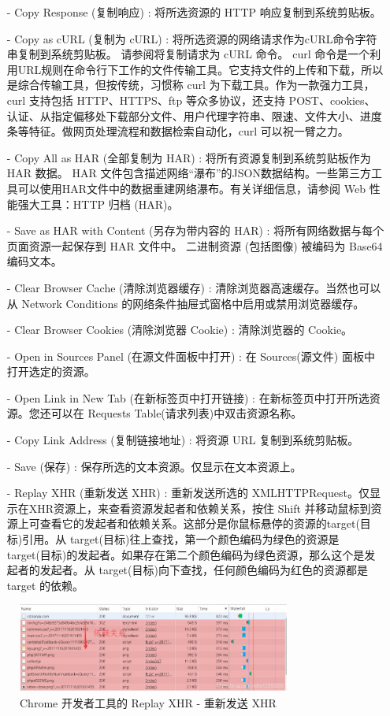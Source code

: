 \begin{itemize}
\item [-] Copy Response (复制响应) : 将所选资源的 HTTP 响应复制到系统剪贴板。
\item [-] Copy as cURL (复制为 cURL) : 将所选资源的网络请求作为cURL命令字符串复制到系统剪贴板。 请参阅将复制请求为 cURL 命令。 curl 命令是一个利用URL规则在命令行下工作的文件传输工具。它支持文件的上传和下载，所以是综合传输工具，但按传统，习惯称 curl 为下载工具。作为一款强力工具，curl 支持包括 HTTP、HTTPS、ftp 等众多协议，还支持 POST、cookies、认证、从指定偏移处下载部分文件、用户代理字符串、限速、文件大小、进度条等特征。做网页处理流程和数据检索自动化，curl 可以祝一臂之力。
\item [-] Copy All as HAR (全部复制为 HAR) : 将所有资源复制到系统剪贴板作为 HAR 数据。 HAR 文件包含描述网络“瀑布”的JSON数据结构。一些第三方工具可以使用HAR文件中的数据重建网络瀑布。有关详细信息，请参阅 Web 性能强大工具：HTTP 归档 (HAR)。
\item [-] Save as HAR with Content (另存为带内容的 HAR) : 将所有网络数据与每个页面资源一起保存到 HAR 文件中。 二进制资源 (包括图像) 被编码为 Base64 编码文本。
\item [-] Clear Browser Cache (清除浏览器缓存) : 清除浏览器高速缓存。当然也可以从 Network Conditions 的网络条件抽屉式窗格中启用或禁用浏览器缓存。
\item [-] Clear Browser Cookies (清除浏览器 Cookie) : 清除浏览器的 Cookie。
\item [-] Open in Sources Panel (在源文件面板中打开) : 在 Sources(源文件) 面板中打开选定的资源。
\item [-] Open Link in New Tab (在新标签页中打开链接) : 在新标签页中打开所选资源。您还可以在 Requests Table(请求列表)中双击资源名称。
\item [-] Copy Link Address (复制链接地址) : 将资源 URL 复制到系统剪贴板。
\item [-] Save (保存) : 保存所选的文本资源。仅显示在文本资源上。
\item [-] Replay XHR (重新发送 XHR) : 重新发送所选的 XMLHTTPRequest。仅显示在XHR资源上，来查看资源发起者和依赖关系，按住 Shift 并移动鼠标到资源上可查看它的发起者和依赖关系。这部分是你鼠标悬停的资源的target(目标)引用。从 target(目标)往上查找，第一个颜色编码为绿色的资源是 target(目标)的发起者。如果存在第二个颜色编码为绿色资源，那么这个是发起者的发起者。从 target(目标)向下查找，任何颜色编码为红色的资源都是 target 的依赖。
\end{itemize}

\begin{figure}[htb]
\centering 
\includegraphics[width=0.80\textwidth]{img/newch1m15.png} 
\caption{Chrome 开发者工具的 Replay XHR - 重新发送 XHR}
\label{Test}
\end{figure}

